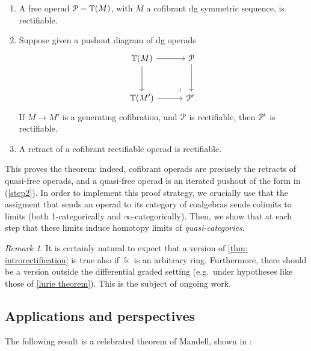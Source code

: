 \documentclass{proc-l}
\renewcommand{\mathcal}{\EuScript}
\theoremstyle{plain}
\theoremstyle{definition}
\theoremstyle{remark}
\newtheorem{remark}[{theorem}]{Remark}
\newcommand{\kk}{\Bbbk}
\begin{document}
\begin{enumerate}
\item \label{step1}A free operad $\mathcal P = \mathbb T(M)$, with $M$ a cofibrant dg symmetric sequence, is rectifiable.
\item \label{step2}Suppose given a pushout diagram of dg operads
\[
\begin{tikzcd}[column sep=2.5pc,row sep=2.5pc]
\mathbb T(M) \arrow[r] \arrow[d] \arrow[dr, phantom,"\ulcorner" rotate=-180, very near end] &
\mathcal P \arrow[d] \\
\mathbb T(M') \arrow[r] &
\mathcal P'.
\end{tikzcd}
\]
If $M \longrightarrow M'$ is a generating cofibration, and $\mathcal P$ is rectifiable, then $\mathcal P'$ is rectifiable.
\item \label{step3} A retract of a cofibrant rectifiable operad is rectifiable.
\end{enumerate}
This proves the theorem: indeed, cofibrant operads are precisely the retracts of quasi-free operads, and a quasi-free operad is an iterated pushout of the form in (\ref{step2}). In order to implement this proof strategy, we crucially use that the assigment that sends an operad to its category of coalgebras sends colimits to limits (both 1-categorically and $\infty$-categorically). Then, we show that at each step that these limits induce homotopy limits of \textit{quasi-categories}.

\begin{remark}%
\label{Remark:1.10}It is certainly natural to expect that a version of \cref{thm: introrectification} is true also if $\kk$ is an arbitrary ring. Furthermore, there should be a version outside the differential graded setting (e.g.~under hypotheses like those of \cref{lurie theorem}). This is the subject of ongoing work.
\end{remark}

\subsection{Applications and perspectives}%
\label{Section:1.5}
The following result is a celebrated theorem of Mandell, shown in \cite{Mandell01}:
\end{document}
